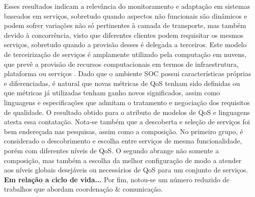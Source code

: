 Esses resultados indicam a relevância do monitoramento e adaptação em sistemas baseados em serviços, sobretudo quando aspectos não funcionais  são dinâmicos e podem sofrer variações não só pertinentes à camada de transporte, mas também devido à concorrência, visto que diferentes clientes podem requisitar os mesmos serviços, sobretudo quando a provisão desses é delegada a terceiros. Este modelo de terceirização de serviços é amplamente utilizado pela computação em nuvens, que prevê a provisão de recursos computacionais em termos de infraestrutura, plataforma ou serviços \cite{10.1109/MIC.2010.147}. Dado que o ambiente SOC possui características próprias e diferenciadas, é natural que novas métricas de QoS tenham sido definidas ou que métricas já utilizadas tenham ganho novos significados, assim como linguagens e especificações que admitam o tratamento e negociação dos requisitos de qualidade. O resultado obtido para o atributo de modelos de QoS e linguagens atesta essa contatação. Nota-se também que a descoberta e seleção de serviços foi bem endereçada nas pesquisas, assim como a composição. No primeiro grupo, é considerado o descobrimento e escolha entre serviços de mesma funcionalidade, porém com diferentes níveis de QoS. O segundo abrange não somente a composição, mas também a escolha da melhor configuração de modo a atender aos níveis globais desejáveis ou necessários de QoS para um conjunto de serviços. \textbf{Em relação a ciclo de vida...} Por fim, notou-se um número reduzido de trabalhos que abordam coordenação \& comunicação. 